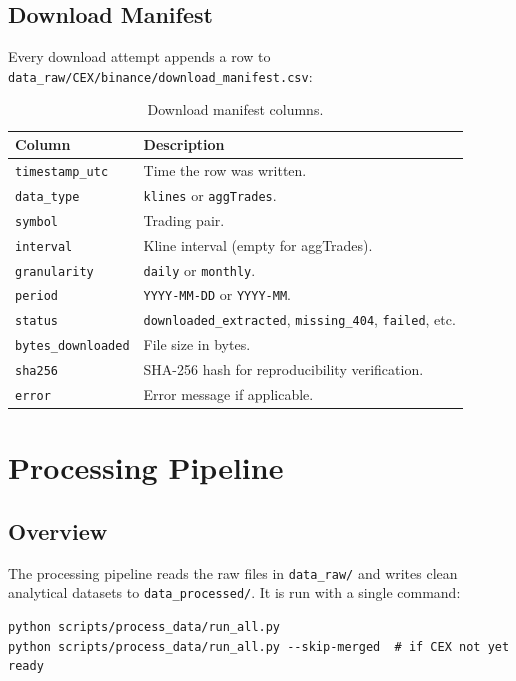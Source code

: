 \documentclass[11pt,a4paper]{article}
\begin{document}
\subsection{Download Manifest}

Every download attempt appends a row to \texttt{data\_raw/CEX/binance/download\_manifest.csv}:

\begin{table}[H]
\centering
\small
\begin{tabular}{ll}
\toprule
\textbf{Column} & \textbf{Description} \\
\midrule
\texttt{timestamp\_utc} & Time the row was written. \\
\texttt{data\_type}     & \texttt{klines} or \texttt{aggTrades}. \\
\texttt{symbol}         & Trading pair. \\
\texttt{interval}       & Kline interval (empty for aggTrades). \\
\texttt{granularity}    & \texttt{daily} or \texttt{monthly}. \\
\texttt{period}         & \texttt{YYYY-MM-DD} or \texttt{YYYY-MM}. \\
\texttt{status}         & \texttt{downloaded\_extracted}, \texttt{missing\_404}, \texttt{failed}, etc. \\
\texttt{bytes\_downloaded} & File size in bytes. \\
\texttt{sha256}         & SHA-256 hash for reproducibility verification. \\
\texttt{error}          & Error message if applicable. \\
\bottomrule
\end{tabular}
\caption{Download manifest columns.}
\end{table}

\section{Processing Pipeline}

\subsection{Overview}

The processing pipeline reads the raw files in \texttt{data\_raw/} and writes clean analytical datasets to \texttt{data\_processed/}. It is run with a single command:

\begin{lstlisting}
python scripts/process_data/run_all.py
python scripts/process_data/run_all.py --skip-merged  # if CEX not yet ready
\end{lstlisting}
\end{document}
